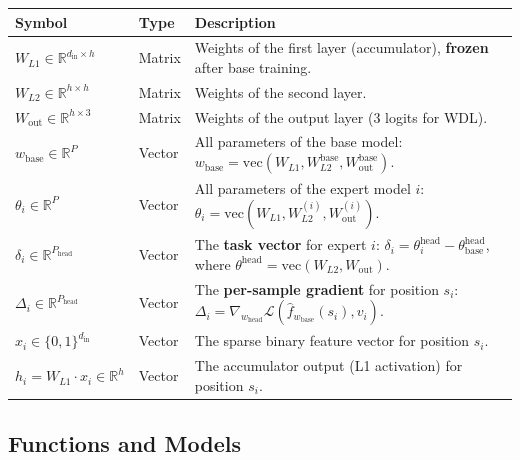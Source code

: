\begin{center}
\small
\begin{tabularx}{\textwidth}{@{}>{\raggedright\arraybackslash}p{} l X@{}}
\hline
\textbf{Symbol} & \textbf{Type} & \textbf{Description} \\
\hline
\(W_{L1} \in \mathbb{R}^{d_{\mathrm{in}} \times h}\) &
  Matrix &
  Weights of the first layer (accumulator), \textbf{frozen} after base training. \\
\(W_{L2} \in \mathbb{R}^{h \times h}\) &
  Matrix &
  Weights of the second layer. \\
\(W_{\mathrm{out}} \in \mathbb{R}^{h \times 3}\) &
  Matrix &
  Weights of the output layer (3 logits for WDL). \\
\(w_{\mathrm{base}} \in \mathbb{R}^{P}\) &
  Vector &
  All parameters of the base model: \(w_{\mathrm{base}} = \mathrm{vec}(W_{L1}, W_{L2}^{\mathrm{base}}, W_{\mathrm{out}}^{\mathrm{base}})\). \\
\(\theta_i \in \mathbb{R}^{P}\) &
  Vector &
  All parameters of the expert model \(i\): \(\theta_i = \mathrm{vec}(W_{L1}, W_{L2}^{(i)}, W_{\mathrm{out}}^{(i)})\). \\
\(\delta_i \in \mathbb{R}^{P_{\mathrm{head}}}\) &
  Vector &
  The \textbf{task vector} for expert \(i\): \(\delta_i = \theta_i^{\mathrm{head}} - \theta_{\mathrm{base}}^{\mathrm{head}}\), where \(\theta^{\mathrm{head}} = \mathrm{vec}(W_{L2}, W_{\mathrm{out}})\). \\
\(\Delta_i \in \mathbb{R}^{P_{\mathrm{head}}}\) &
  Vector &
  The \textbf{per-sample gradient} for position \(s_i\): \(\Delta_i = \nabla_{w_{\mathrm{head}}} \mathcal{L}(\hat{f}_{w_{\mathrm{base}}}(s_i), v_i)\). \\
\(x_i \in \{0,1\}^{d_{\mathrm{in}}}\) &
  Vector &
  The sparse binary feature vector for position \(s_i\). \\
\(h_i = W_{L1} \cdot x_i \in \mathbb{R}^{h}\) &
  Vector &
  The accumulator output (L1 activation) for position \(s_i\). \\
\hline
\end{tabularx}
\end{center}

\subsection{Functions and Models}\label{sec:notation-functions}


